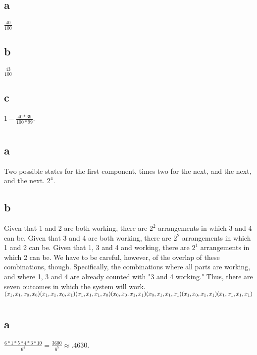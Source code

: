 \documentclass[12pt]{article}
\begin{document}
\subsection*{a}
\(\frac{40}{100}\)
\subsection*{b}
\(\frac{43}{100}\)
\subsection*{c}
\(1-\frac{40*39}{100*99}\).

\section{}
\subsection*{a}
Two possible states for the first component, times two for the next, and the next, and the next. \(2^4\).
\subsection*{b}
Given that 1 and 2 are both working, there are \(2^2\) arrangements in which 3 and 4 can be. Given that 3 and 4 are both working, there are \(2^2\) arrangements in which 1 and 2 can be.  Given that 1, 3 and 4 and working, there are \(2^1\) arrangements in which 2 can be. We have to be careful, however, of the overlap of these combinations, though. Specifically, the combinations where all parts are working, and where 1, 3 and 4 are already counted with "3 and 4 working." Thus, there are seven outcomes in which the system will work.\\
\((x_1,x_1,x_0,x_0)\\
(x_1,x_1,x_0,x_1)\\
(x_1,x_1,x_1,x_0)\\
(x_0,x_0,x_1,x_1)\\
(x_0,x_1,x_1,x_1)\\
(x_1,x_0,x_1,x_1)\\
(x_1,x_1,x_1,x_1)\\\)
\section{}
\subsection*{a}
\(\frac{6*1*5*4*3*10}{6^5} = \frac{3600}{6^5} \approx .4630\).
\end{document}
